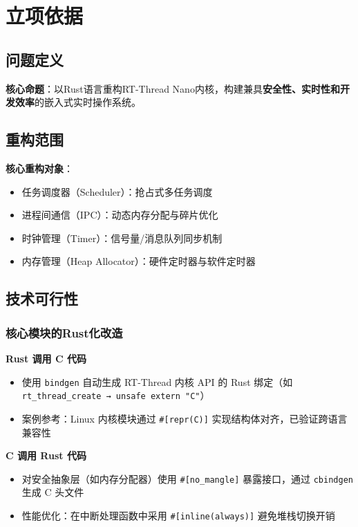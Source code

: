 \section{立项依据}

\subsection{问题定义}

\textbf{核心命题}：以Rust语言重构RT-Thread Nano内核，构建兼具\textbf{安全性、实时性和开发效率}的嵌入式实时操作系统。

\subsection{重构范围}

\textbf{核心重构对象}：

\begin{itemize}
    \item 任务调度器（Scheduler）：抢占式多任务调度
    \item 进程间通信（IPC）：动态内存分配与碎片优化
    \item 时钟管理（Timer）：信号量/消息队列同步机制
    \item 内存管理（Heap Allocator）：硬件定时器与软件定时器
\end{itemize}

\subsection{技术可行性}

\subsubsection{核心模块的Rust化改造}
\textbf{Rust 调用 C 代码}
\begin{itemize}
    \item 使用 \texttt{bindgen} 自动生成 RT-Thread 内核 API 的 Rust 绑定（如 \texttt{rt\_thread\_create → unsafe extern "C"}）\cite{RustBindgen}
    \item 案例参考：Linux 内核模块通过 \texttt{\#[repr(C)]} 实现结构体对齐，已验证跨语言兼容性
\end{itemize}

\textbf{C 调用 Rust 代码}
\begin{itemize}
    \item 对安全抽象层（如内存分配器）使用 \texttt{\#[no\_mangle]} 暴露接口，通过 \texttt{cbindgen} 生成 C 头文件\cite{RustCbindgen}
    \item 性能优化：在中断处理函数中采用 \texttt{\#[inline(always)]} 避免堆栈切换开销
\end{itemize}

